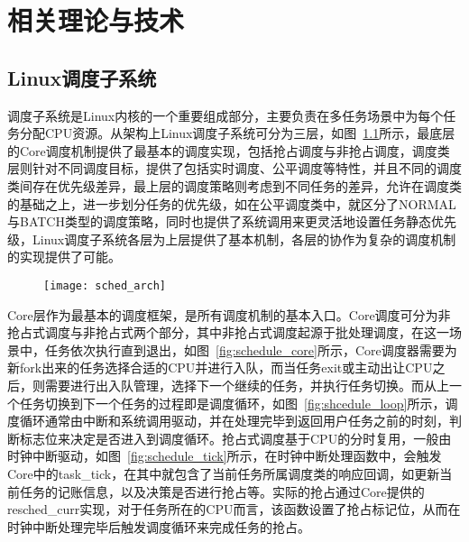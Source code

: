 \chapter{相关理论与技术}\label{chap:theories_tech}

\section{Linux调度子系统}


调度子系统是Linux内核的一个重要组成部分，主要负责在多任务场景中为每个任务分配CPU资源。从架构上Linux调度子系统可分为三层，如图~\ref{fig:sched_arch}所示，最底层的Core调度机制提供了最基本的调度实现，包括抢占调度与非抢占调度，调度类层则针对不同调度目标，提供了包括实时调度、公平调度等特性，并且不同的调度类间存在优先级差异，最上层的调度策略则考虑到不同任务的差异，允许在调度类的基础之上，进一步划分任务的优先级，如在公平调度类中，就区分了NORMAL与BATCH类型的调度策略，同时也提供了系统调用来更灵活地设置任务静态优先级，Linux调度子系统各层为上层提供了基本机制，各层的协作为复杂的调度机制的实现提供了可能。

\begin{figure}[!htbp]
    \centering
    \texttt{[image: sched\_arch]}
    \label{fig:sched_arch}
\end{figure}

Core层作为最基本的调度框架，是所有调度机制的基本入口。Core调度可分为非抢占式调度与非抢占式两个部分，其中非抢占式调度起源于批处理调度，在这一场景中，任务依次执行直到退出，如图~\ref{fig:schedule_core}所示，Core调度器需要为新fork出来的任务选择合适的CPU并进行入队，而当任务exit或主动出让CPU之后，则需要进行出入队管理，选择下一个继续的任务，并执行任务切换。而从上一个任务切换到下一个任务的过程即是调度循环，如图~\ref{fig:shcedule_loop}所示，调度循环通常由中断和系统调用驱动，并在处理完毕到返回用户任务之前的时刻，判断标志位来决定是否进入到调度循环。抢占式调度基于CPU的分时复用，一般由时钟中断驱动，如图~\ref{fig:schedule_tick}所示，在时钟中断处理函数中，会触发Core中的task\_tick，在其中就包含了当前任务所属调度类的响应回调，如更新当前任务的记账信息，以及决策是否进行抢占等。实际的抢占通过Core提供的resched\_curr实现，对于任务所在的CPU而言，该函数设置了抢占标记位，从而在时钟中断处理完毕后触发调度循环来完成任务的抢占。

